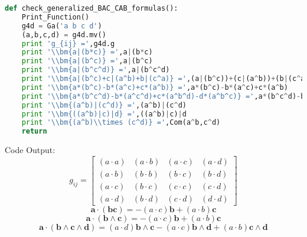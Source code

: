 \documentclass[10pt,fleqn]{report}
\newcommand{\W}{\wedge}
\begin{document}
\begin{lstlisting}[language=Python,showspaces=false,showstringspaces=false,backgroundcolor=\color{gray},frame=single]
def check_generalized_BAC_CAB_formulas():
    Print_Function()
    g4d = Ga('a b c d')
    (a,b,c,d) = g4d.mv()
    print 'g_{ij} =',g4d.g
    print '\\bm{a|(b*c)} =',a|(b*c)
    print '\\bm{a|(b^c)} =',a|(b^c)
    print '\\bm{a|(b^c^d)} =',a|(b^c^d)
    print '\\bm{a|(b^c)+c|(a^b)+b|(c^a)} =',(a|(b^c))+(c|(a^b))+(b|(c^a))
    print '\\bm{a*(b^c)-b*(a^c)+c*(a^b)} =',a*(b^c)-b*(a^c)+c*(a^b)
    print '\\bm{a*(b^c^d)-b*(a^c^d)+c*(a^b^d)-d*(a^b^c)} =',a*(b^c^d)-b*(a^c^d)+c*(a^b^d)-d*(a^b^c)
    print '\\bm{(a^b)|(c^d)} =',(a^b)|(c^d)
    print '\\bm{((a^b)|c)|d} =',((a^b)|c)|d
    print '\\bm{(a^b)\\times (c^d)} =',Com(a^b,c^d)
    return
\end{lstlisting}
Code Output:
\begin{equation*} g_{ij} = \left[\begin{matrix}\left ( a\cdot a\right )  & \left ( a\cdot b\right )  & \left ( a\cdot c\right )  & \left ( a\cdot d\right ) \\\left ( a\cdot b\right )  & \left ( b\cdot b\right )  & \left ( b\cdot c\right )  & \left ( b\cdot d\right ) \\\left ( a\cdot c\right )  & \left ( b\cdot c\right )  & \left ( c\cdot c\right )  & \left ( c\cdot d\right ) \\\left ( a\cdot d\right )  & \left ( b\cdot d\right )  & \left ( c\cdot d\right )  & \left ( d\cdot d\right ) \end{matrix}\right] \end{equation*}
\begin{equation*} \bm{a\cdot (b c)} = - \left ( a\cdot c\right )  \boldsymbol{b} + \left ( a\cdot b\right )  \boldsymbol{c} \end{equation*}
\begin{equation*} \bm{a\cdot (b\W c)} = - \left ( a\cdot c\right )  \boldsymbol{b} + \left ( a\cdot b\right )  \boldsymbol{c} \end{equation*}
\begin{equation*} \bm{a\cdot (b\W c\W d)} = \left ( a\cdot d\right )  \boldsymbol{b\wedge c} - \left ( a\cdot c\right )  \boldsymbol{b\wedge d} + \left ( a\cdot b\right )  \boldsymbol{c\wedge d} \end{equation*}
\end{document}
